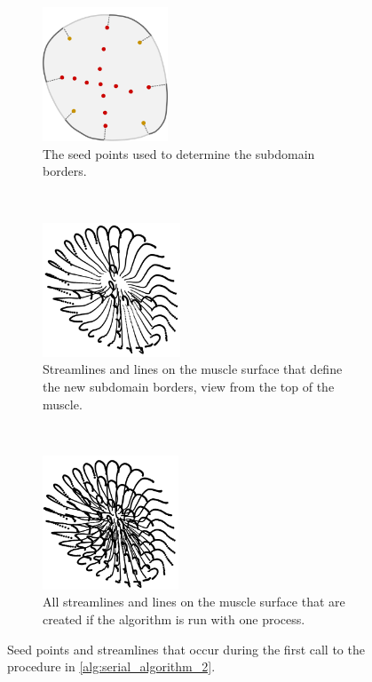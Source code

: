 \begin{figure}
  \centering
  \begin{subfigure}[t]{0.30\textwidth}%
    \centering%
    \includegraphics[height=4cm]{images/parallel_fiber_estimation/seed_points_to_send_1a.png}
    \caption{The seed points used to determine the subdomain borders. }%
    \label{fig:seed_points_to_send_1}%
  \end{subfigure}
  \,
  \begin{subfigure}[t]{0.30\textwidth}%
    \centering%
    \includegraphics[height=4cm]{images/parallel_fiber_estimation/fixed_1.png}
    \caption{Streamlines and lines on the muscle surface that define the new subdomain borders, view from the top of the muscle.}%
    \label{fig:fixed_1}%
  \end{subfigure}
  \,
  \begin{subfigure}[t]{0.30\textwidth}%
    \centering%
    \includegraphics[height=4cm]{images/parallel_fiber_estimation/final_interior_1.png}
    \caption{All streamlines and lines on the muscle surface that are created if the algorithm is run with one process.}%
    \label{fig:final_interior_1}%
  \end{subfigure}
  \caption{Seed points and streamlines that occur during the first call to the procedure in \cref{alg:serial_algorithm_2}.}
  \label{fig:seed_points}%
\end{figure}


